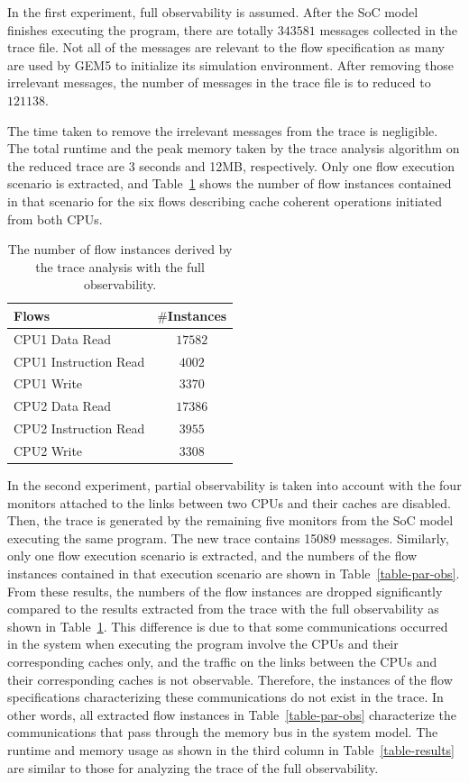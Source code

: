 \documentclass[12pt,frontmatter,copyright,thesis]{usfmanus}
\begin{document}
In the first experiment, full observability is assumed.
After the SoC model finishes executing the program, there
are totally $343581$ messages collected in the trace file.
Not all of the messages are relevant to the flow
specification as many are used by GEM5 to initialize its
simulation environment.  After removing those irrelevant
messages, the number of messages in the trace file is to
reduced to $121138$.

The time taken to remove the irrelevant messages from the
trace is negligible.  The total runtime and the peak memory
taken by the trace analysis algorithm on the reduced
trace are 3 seconds and 12MB, respectively.  Only one flow execution
scenario is extracted, and 
Table~\ref{table-case-2} shows the number of flow instances contained in that
scenario for the six 
flows describing cache coherent operations initiated from both CPUs.
\begin{table}[tb]
\caption{The number of flow instances derived by the trace analysis with the full observability.}
\begin{center}
\begin{tabular}{|l|c|}
\hline
Flows & $\#$Instances \\
\hline
\hline
CPU1 Data Read			&  $17582$\\
CPU1 Instruction Read		&  $4002$\\
CPU1 Write				&  $3370$\\
\hline
CPU2 Data Read			&  $17386$\\
CPU2 Instruction Read		&  $3955$\\
CPU2 Write				&  $3308$\\
\hline
\end{tabular}
\end{center}
\label{table-case-2}
\end{table}%

In the second experiment, partial observability is taken into account
with the four monitors attached to the links between two CPUs and their
caches are disabled. Then, the trace is generated by the
remaining five monitors from the SoC model executing the
same program.  The new trace contains 15089 messages.  
Similarly, only one flow execution
scenario is extracted, and the numbers of the
flow instances contained in that execution scenario are
shown in Table~\ref{table-par-obs}.  From these results, the
numbers of the flow instances are dropped significantly
compared to the results extracted from the trace with the
full observability as shown in
Table~\ref{table-case-2}. This difference is due to that
some communications occurred in the system when executing
the program involve the CPUs and their corresponding caches
only, and the traffic on the links between the CPUs and
their corresponding caches is not observable. Therefore, the
instances of the flow specifications characterizing these
communications do not exist in the trace. In other words,
all extracted flow instances in Table~\ref{table-par-obs}
characterize the communications that pass through the memory
bus in the system model.  The runtime and memory usage as shown in
the third column in Table~\ref{table-results} are
similar to those for analyzing the trace of the full
observability.
\end{document}
